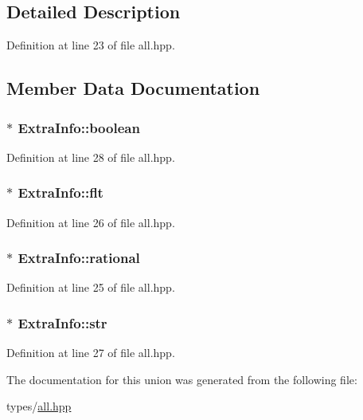 \subsection{Detailed Description}


Definition at line 23 of file all.\+hpp.



\subsection{Member Data Documentation}
\hypertarget{union_extra_info_aca965abbb21d8d62613031fd4c335d82}{}
\subsubsection[{boolean}]{$\ast$ Extra\+Info\+::boolean}\label{union_extra_info_aca965abbb21d8d62613031fd4c335d82}


Definition at line 28 of file all.\+hpp.

\hypertarget{union_extra_info_a6666187612fd771c8a8965a3de25d548}{}
\subsubsection[{flt}]{$\ast$ Extra\+Info\+::flt}\label{union_extra_info_a6666187612fd771c8a8965a3de25d548}


Definition at line 26 of file all.\+hpp.

\hypertarget{union_extra_info_a454286653cbc574463a4cf114cd2d89e}{}
\subsubsection[{rational}]{$\ast$ Extra\+Info\+::rational}\label{union_extra_info_a454286653cbc574463a4cf114cd2d89e}


Definition at line 25 of file all.\+hpp.

\hypertarget{union_extra_info_abdaf052f1a3cbb9063acc703433e081c}{}
\subsubsection[{str}]{$\ast$ Extra\+Info\+::str}\label{union_extra_info_abdaf052f1a3cbb9063acc703433e081c}


Definition at line 27 of file all.\+hpp.



The documentation for this union was generated from the following file\+:\begin{DoxyCompactItemize}
\item 
types/\hyperlink{all_8hpp}{all.\+hpp}\end{DoxyCompactItemize}
